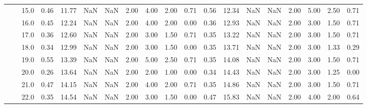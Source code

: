 \begin{tabular}{lllrrrrrrrrrrrrrrrr}
       &     & 15.0 &      0.46 &      11.77 &               NaN &                NaN & 2.00 &   4.00 &             2.00 &                         0.71 &      0.56 &      12.34 &               NaN &                NaN & 2.00 &   5.00 &             2.50 &                         0.71 \\
       &     & 16.0 &      0.45 &      12.24 &               NaN &                NaN & 2.00 &   4.00 &             2.00 &                         0.00 &      0.36 &      12.93 &               NaN &                NaN & 2.00 &   3.00 &             1.50 &                         0.71 \\
       &     & 17.0 &      0.36 &      12.60 &               NaN &                NaN & 2.00 &   3.00 &             1.50 &                         0.71 &      0.35 &      13.22 &               NaN &                NaN & 2.00 &   3.00 &             1.50 &                         0.71 \\
       &     & 18.0 &      0.34 &      12.99 &               NaN &                NaN & 2.00 &   3.00 &             1.50 &                         0.00 &      0.35 &      13.71 &               NaN &                NaN & 2.00 &   3.00 &             1.33 &                         0.29 \\
       &     & 19.0 &      0.55 &      13.39 &               NaN &                NaN & 2.00 &   5.00 &             2.50 &                         0.71 &      0.35 &      14.08 &               NaN &                NaN & 2.00 &   3.00 &             1.50 &                         0.71 \\
       &     & 20.0 &      0.26 &      13.64 &               NaN &                NaN & 2.00 &   2.00 &             1.00 &                         0.00 &      0.34 &      14.43 &               NaN &                NaN & 2.00 &   3.00 &             1.25 &                         0.00 \\
       &     & 21.0 &      0.47 &      14.15 &               NaN &                NaN & 2.00 &   4.00 &             2.00 &                         0.71 &      0.35 &      14.86 &               NaN &                NaN & 2.00 &   3.00 &             1.50 &                         0.71 \\
       &     & 22.0 &      0.35 &      14.54 &               NaN &                NaN & 2.00 &   3.00 &             1.50 &                         0.00 &      0.47 &      15.83 &               NaN &                NaN & 2.00 &   4.00 &             2.00 &                         0.64 \\

\end{tabular}
